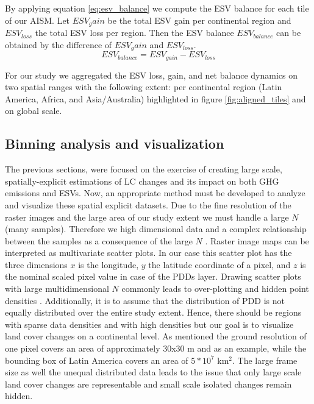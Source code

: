 		By applying equation \ref{eq:esv_balance} we compute the \ac{ESV} balance for each tile of our \ac{AISM}. Let $ESV_gain$ be the total \ac{ESV} gain per continental region and $ESV_{loss}$ the total \ac{ESV} loss per region. Then the \ac{ESV} balance $ESV_{balance}$ can be obtained by the difference of $ESV_gain$ and $ESV_{loss}$.
		\begin{equation}
		\label{eq:esv_balance}
			ESV_{balance} = ESV_{gain} - ESV_{loss}
		\end{equation}

		For our study we aggregated the \ac{ESV} loss, gain, and net balance dynamics on two spatial ranges with the following extent: per continental region (Latin America, Africa, and Asia/Australia) highlighted in figure \ref{fig:aligned_tiles} and on global scale.

	\subsection{Binning analysis and visualization}
	\label{subsec:methods_binning}
		The previous sections, were focused on the exercise of creating large scale, spatially-explicit estimations of \ac{LC} changes and its impact on both \ac{GHG} emissions and \acp{ESV}. Now, an appropriate method must be developed to analyze and visualize these spatial explicit datasets. Due to the fine resolution of the raster images and the large area of our study extent we must handle a large $N$ (many samples). Therefore we high dimensional data and a complex relationship between the samples as a consequence of the large $N$ \citep{Carr1990}. Raster image maps can be interpreted as multivariate scatter plots. In our case this scatter plot has the three dimensions $x$ is the longitude, $y$ the latitude coordinate of a pixel, and $z$ is the nominal scaled pixel value in case of the \acp{PDD} layer. Drawing scatter plots with large multidimensional $N$ commonly leads to over-plotting and hidden point densities \citep{Carr1987}. Additionally, it is to assume that the distribution of \ac{PDD} is not equally distributed over the entire study extent. Hence, there should be regions with sparse data densities and with high densities but our goal is to visualize land cover changes on a continental level. As mentioned the ground resolution of one pixel covers an area of approximately 30x30 m and as an example, while the bounding box of Latin America covers an area of $5*10^7$ km$^2$. The large frame size as well the unequal distributed data leads to the issue that only large scale land cover changes are representable and small scale isolated changes remain hidden.

